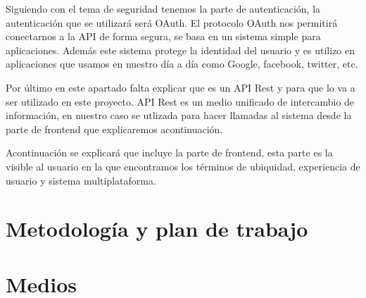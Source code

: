 \documentclass{article}
\begin{document}
Siguiendo con el tema de seguridad tenemos la parte de autenticación, la autenticación que se utilizará será OAuth. El protocolo OAuth nos permitirá conectarnos a la API de forma segura, se basa en un sistema simple para aplicaciones. Además este sistema protege la identidad del usuario y es utilizo en aplicaciones que usamos en nuestro día a día como Google, facebook, twitter, etc.

Por último en este apartado falta explicar que es un API Rest y para que lo va a ser utilizado en este proyecto. API Rest es un medio unificado de intercambio de información, en nuestro caso se utlizada para hacer llamadas al sistema desde la parte de frontend que explicaremos acontinuación.

Acontinuación se explicará que incluye la parte de frontend, esta parte es la visible al usuario en la que encontramos los términos de ubiquidad, experiencia de usuario y sistema multiplataforma. 






\section{Metodología y plan de trabajo}



\section{Medios}




\nocite{*}

\end{document}
